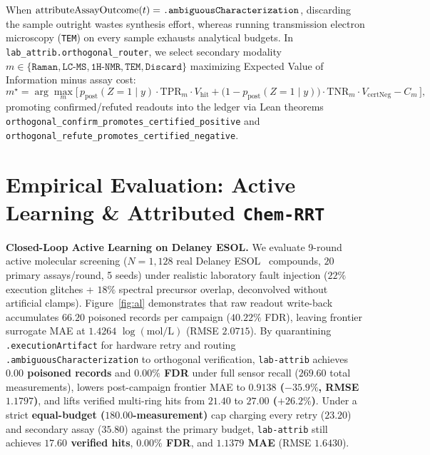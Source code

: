 \documentclass[10pt,letterpaper]{article}
\begin{document}
When $\mathrm{attributeAssayOutcome}(t) = \texttt{.ambiguous\allowbreak Characterization}$, discarding the sample outright wastes synthesis effort, whereas running transmission electron microscopy (\texttt{TEM}) on every sample exhausts analytical budgets. In \texttt{lab\_attrib.\allowbreak orthogonal\_router}, we select secondary modality $m \in \{\texttt{Raman}, \allowbreak \texttt{LC-MS}, \allowbreak \texttt{1H-NMR}, \allowbreak \texttt{TEM}, \allowbreak \texttt{Discard}\}$ maximizing Expected Value of Information minus assay cost:
\begin{equation}
  m^\star = \arg\max_{m} \Big[\, p_{\mathrm{post}}(Z=1 \mid y)\cdot \mathrm{TPR}_m \cdot V_{\mathrm{hit}} + \big(1 - p_{\mathrm{post}}(Z=1 \mid y)\big)\cdot \mathrm{TNR}_m \cdot V_{\mathrm{certNeg}} - C_m \,\Big],
\end{equation}
promoting confirmed/refuted readouts into the ledger via Lean theorems \texttt{orthogonal\_confirm\_\allowbreak promotes\_\allowbreak certified\_positive} and \texttt{orthogonal\_refute\_\allowbreak promotes\_\allowbreak certified\_negative}.

\section{Empirical Evaluation: Active Learning \& Attributed \texttt{Chem-RRT}}

\textbf{Closed-Loop Active Learning on Delaney ESOL.} We evaluate 9-round active molecular screening ($N=1{,}128$ real Delaney ESOL~\cite{delaney2004esol} compounds, $20$ primary assays/round, 5 seeds) under realistic laboratory fault injection ($22\%$ execution glitches + $18\%$ spectral precursor overlap, deconvolved without artificial clamps). Figure~\ref{fig:al} demonstrates that raw readout write-back accumulates $66.20$ poisoned records per campaign ($40.22\%$ FDR), leaving frontier surrogate MAE at $1.4264$ $\log(\text{mol/L})$ (RMSE $2.0715$). By quarantining \texttt{.executionArtifact} for hardware retry and routing \texttt{.ambiguous\allowbreak Characterization} to orthogonal verification, \texttt{lab-attrib} achieves \textbf{$0.00$ poisoned records} and \textbf{$0.00\%$ FDR} under full sensor recall ($269.60$ total measurements), lowers post-campaign frontier MAE to \textbf{$0.9138$ ($-35.9\%$, RMSE $1.1797$)}, and lifts verified multi-ring hits from $21.40$ to \textbf{$27.00$ ($+26.2\%$)}. Under a strict \textbf{equal-budget ($180.00$-measurement)} cap charging every retry ($23.20$) and secondary assay ($35.80$) against the primary budget, \texttt{lab-attrib} still achieves \textbf{$17.60$ verified hits}, \textbf{$0.00\%$ FDR}, and \textbf{$1.1379$ MAE} (RMSE $1.6430$).
\end{document}
